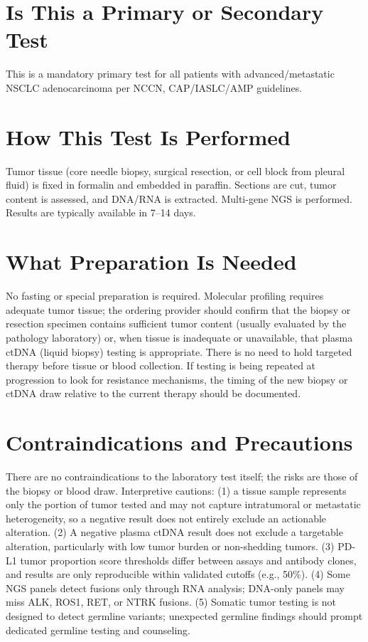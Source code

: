 \section*{Is This a Primary or Secondary Test}
This is a mandatory primary test for all patients with advanced/metastatic NSCLC adenocarcinoma per NCCN, CAP/IASLC/AMP guidelines.

\section*{How This Test Is Performed}
Tumor tissue (core needle biopsy, surgical resection, or cell block from pleural fluid) is fixed in formalin and embedded in paraffin. Sections are cut, tumor content is assessed, and DNA/RNA is extracted. Multi-gene NGS is performed. Results are typically available in 7--14 days.

\section*{What Preparation Is Needed}
No fasting or special preparation is required. Molecular profiling requires adequate tumor tissue; the ordering provider should confirm that the biopsy or resection specimen contains sufficient tumor content (usually evaluated by the pathology laboratory) or, when tissue is inadequate or unavailable, that plasma ctDNA (liquid biopsy) testing is appropriate. There is no need to hold targeted therapy before tissue or blood collection. If testing is being repeated at progression to look for resistance mechanisms, the timing of the new biopsy or ctDNA draw relative to the current therapy should be documented.

\section*{Contraindications and Precautions}
There are no contraindications to the laboratory test itself; the risks are those of the biopsy or blood draw. Interpretive cautions: (1) a tissue sample represents only the portion of tumor tested and may not capture intratumoral or metastatic heterogeneity, so a negative result does not entirely exclude an actionable alteration. (2) A negative plasma ctDNA result does not exclude a targetable alteration, particularly with low tumor burden or non-shedding tumors. (3) PD-L1 tumor proportion score thresholds differ between assays and antibody clones, and results are only reproducible within validated cutoffs (e.g., 50\%). (4) Some NGS panels detect fusions only through RNA analysis; DNA-only panels may miss ALK, ROS1, RET, or NTRK fusions. (5) Somatic tumor testing is not designed to detect germline variants; unexpected germline findings should prompt dedicated germline testing and counseling.

